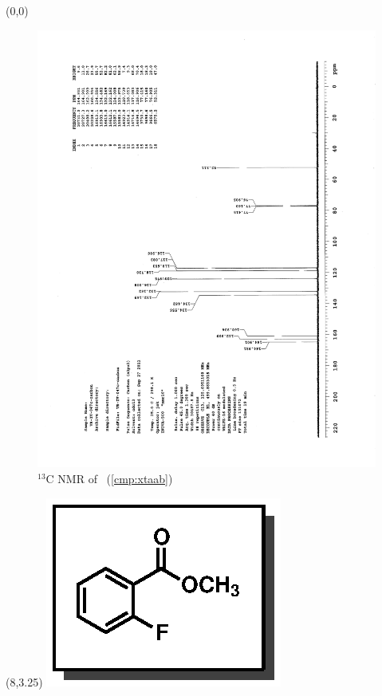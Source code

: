 \clearpage
\begin{textblock}{20}(0,0)
\begin{figure}[htb]
\caption{$^{13}$C NMR of  \CMPxtaab\ (\ref{cmp:xtaab})}
\includegraphics[scale=0.75, trim = 0mm 0mm 0mm 5mm,
clip]{chp_asymmetric/images/nmr/xtaabC}
\vspace{-100pt}
\end{figure}
\end{textblock}
\begin{textblock}{1}(8,3.25)
\includegraphics[scale=0.8, angle=90]{chp_asymmetric/images/xtaab}
\end{textblock}
